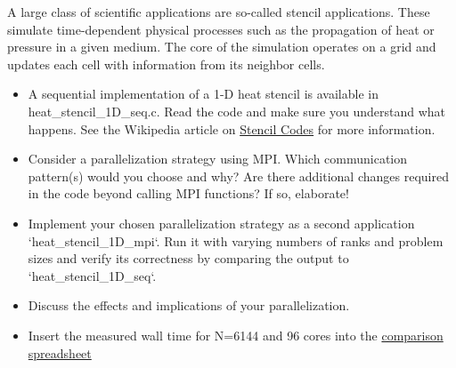 \documentclass[UTF-8]{article}
\begin{document}
	A large class of scientific applications are so-called stencil applications. These simulate time-dependent physical processes such as the propagation of heat or pressure in a given medium. The core of the simulation operates on a grid and updates each cell with information from its neighbor cells.
	
	
	\begin{itemize}
		\item A sequential implementation of a 1-D heat stencil is available in heat\_stencil\_1D\_seq.c. Read the code and make sure you understand what happens. See the Wikipedia article on \href{https://en.wikipedia.org/wiki/Stencil_code}{Stencil Codes} for more information.
		\item Consider a parallelization strategy using MPI. Which communication pattern(s) would you choose and why? Are there additional changes required in the code beyond calling MPI functions? If so, elaborate!
		\item Implement your chosen parallelization strategy as a second application `heat\_stencil\_1D\_mpi`. Run it with varying numbers of ranks and problem sizes and verify its correctness by comparing the output to `heat\_stencil\_1D\_seq`.
		\item Discuss the effects and implications of your parallelization.
		\item Insert the measured wall time for N=6144 and 96 cores into the  \href{https://docs.google.com/spreadsheets/d/1p6d9F12EtykmI2-7MnHkg0U15UAtaCvWz8Ip92ZEsWo}{comparison spreadsheet}
	\end{itemize}
\end{document}
